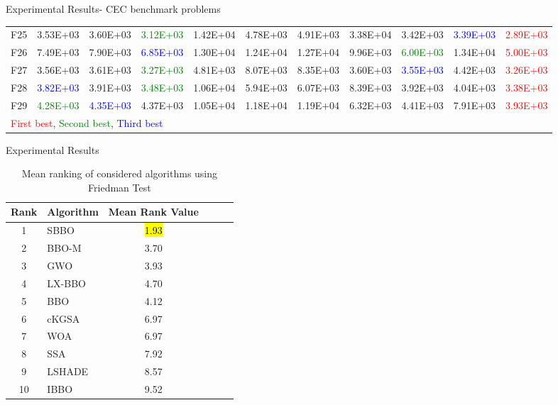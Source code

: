 \documentclass [9pt,times] {beamer}
\begin{document}
\begin{frame}{Experimental Results- CEC benchmark problems }
\begin{center}
\begin{tabular}{p{0.08in}  p{0.25in} |  p{0.23in} |  p{0.25in}|  p{0.25in} |  p{0.25in} | p{0.25in} |  p{0.25in} | p{0.25in} |  p{0.25in} |  p{0.25in}}
F25	&	3.53E+03	&	3.60E+03	&\textcolor{green}{	3.12E+03	}&	1.42E+04	&	4.78E+03	&	4.91E+03	&	3.38E+04	&	3.42E+03	&\textcolor{blue}{	3.39E+03	}&\textcolor{red}{	2.89E+03	}\\
F26	&	7.49E+03	&	7.90E+03	&\textcolor{blue}{	6.85E+03	}&	1.30E+04	&	1.24E+04	&	1.27E+04	&	9.96E+03	&\textcolor{green}{	6.00E+03	}&	1.34E+04	&\textcolor{red}{	5.00E+03	}\\
F27	&	3.56E+03	&	3.61E+03	&\textcolor{green}{	3.27E+03	}&	4.81E+03	&	8.07E+03	&	8.35E+03	&	3.60E+03	&\textcolor{blue}{	3.55E+03	}&	4.42E+03	&\textcolor{red}{	3.26E+03	}\\
F28	&\textcolor{blue}{	3.82E+03	}&	3.91E+03	&\textcolor{green}{	3.48E+03	}&	1.06E+04	&	5.94E+03	&	6.07E+03	&	8.39E+03	&	3.92E+03	&	4.04E+03	&\textcolor{red}{	3.38E+03	}\\
F29	&\textcolor{green}{	4.28E+03	}&\textcolor{blue}{	4.35E+03	}&	4.37E+03	&	1.05E+04	&	1.18E+04	&	1.19E+04	&	6.32E+03	&	4.41E+03	&	7.91E+03	&\textcolor{red}{	3.93E+03	}\\


\hline
\multicolumn{11}{l}{\textcolor{red}{First best}, \textcolor{green}{Second best}, \textcolor{blue}{Third best}}\\
\end{tabular}
\end{center}
   
\end{frame}


\begin{frame}{Experimental Results}
      \fontsize{8pt}{10pt}\selectfont

\begin{table}

\caption{Mean ranking of considered algorithms using Friedman Test}
\centering 
\scriptsize
{\renewcommand{\arraystretch}{2}
\begin{tabular}{ cl cl cl}
\hline
\textbf{Rank} &   \textbf{Algorithm} & \textbf{Mean Rank Value}\\
\hline
1    &    SBBO    &    \hl{1.93    }\\
2    &    BBO-M    &    3.70    \\
3    &    GWO    &    3.93    \\
4    &    LX-BBO   &    4.70    \\
5    &    BBO    &    4.12    \\
6    &    cKGSA    &    6.97    \\
7    &    WOA    &    6.97    \\
8    &    SSA    &    7.92    \\
9    &    LSHADE    &    8.57\\
10    &    IBBO    &    9.52    \\


\hline
\end{tabular}}
\label{tab:rankTest}

\end{table}
         
\end{frame}
  
\end{document}
